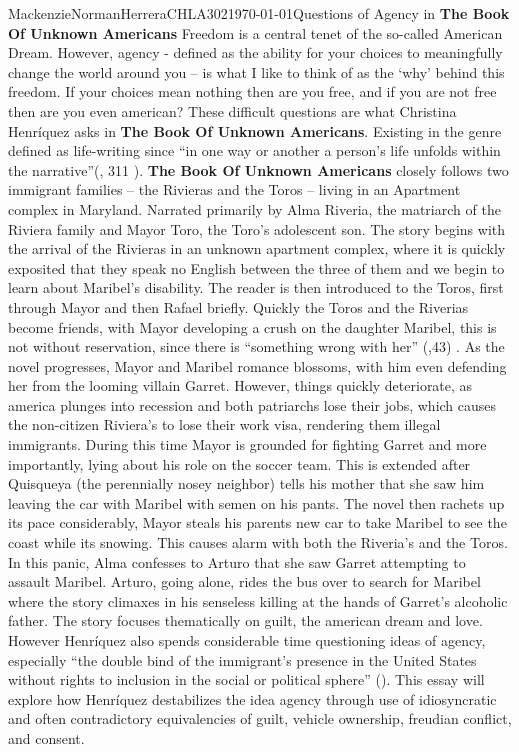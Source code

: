 \documentclass{article}
\begin{document}
\begin{mla}{Mackenzie}{Norman}{Herrera}{CHLA302}{\today}{Questions of Agency in \textbf{The Book Of Unknown Americans}}
Freedom is a central tenet of the so-called American Dream. However, agency - defined as the ability for your choices to  meaningfully change the world around you -- is what I like to think of as the `why' behind this freedom. If your choices mean nothing then are you free, and if you are not free then are you even american? These difficult questions are what Christina Henríquez asks in \textbf{The Book Of Unknown Americans}. Existing in the genre defined as life-writing since ``in one way or another a person's life unfolds within the narrative''(\cite{testimonio}, 311 ). \textbf{The Book Of Unknown Americans} closely follows two immigrant families -- the Rivieras and the Toros -- living in an Apartment complex in Maryland. Narrated primarily by Alma Riveria, the matriarch of the Riviera family and Mayor Toro, the Toro's adolescent son. The story begins with the arrival of the Rivieras in an unknown apartment complex, where it is quickly exposited that they speak no English between the three of them and we begin to learn about Maribel's disability. The reader is then introduced to the Toros, first through Mayor and then Rafael briefly. Quickly the Toros and the Riverias become friends, with Mayor developing a crush on the daughter Maribel, this is not without reservation, since there is ``something wrong with her'' (\cite{Henriquez2014-sh},43) . As the novel progresses, Mayor and Maribel romance blossoms, with him even defending her from the looming villain Garret. However, things quickly deteriorate, as america plunges into recession and both patriarchs lose their jobs, which causes the non-citizen Riviera's to lose their work visa, rendering them illegal immigrants. During this time Mayor is grounded for fighting Garret and more importantly, lying about his role on the soccer team. This is extended after Quisqueya (the perennially nosey neighbor) tells his mother that she saw him   leaving the car with Maribel with semen on his pants. The novel then rachets up its pace considerably, Mayor steals his parents new car to take Maribel to see the coast while its snowing. This causes alarm with both the Riveria's and the Toros. In this panic, Alma confesses to Arturo that she saw Garret attempting to assault Maribel. Arturo, going alone, rides the bus over to search for Maribel where the story climaxes in his senseless killing at the hands of Garret's alcoholic father. The story focuses thematically on guilt, the american dream and love. However Henríquez also spends considerable time questioning ideas of agency, especially ``the double bind of the immigrant’s presence in the United States without rights to inclusion in the social or political sphere'' (\cite{Lutes_Travis_2021}). This essay will explore how Henríquez destabilizes the idea agency through use of idiosyncratic and often contradictory equivalencies of guilt, vehicle ownership, freudian conflict, and consent.



\end{mla}
\end{document}
